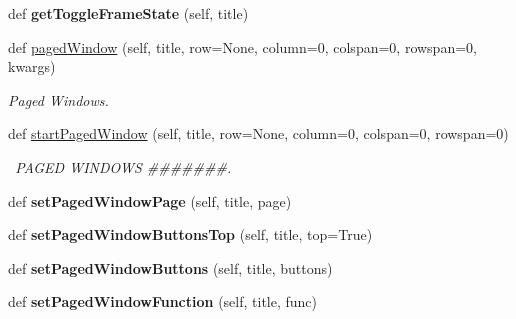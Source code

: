 \begin{DoxyCompactItemize}
\mbox{\label{class_python_01_g_u_i_1_1appjar_1_1gui_a4da3456b9cf56e925d637e1dff484bee}} 
def {\bfseries get\+Toggle\+Frame\+State} (self, title)
\item 
\mbox{\label{class_python_01_g_u_i_1_1appjar_1_1gui_a4ee391c09e882a456617d24693a8b80e}} 
def \hyperlink{class_python_01_g_u_i_1_1appjar_1_1gui_a4ee391c09e882a456617d24693a8b80e}{paged\+Window} (self, title, row=None, column=0, colspan=0, rowspan=0, kwargs)
\begin{DoxyCompactList}\small\item\em Paged Windows. \end{DoxyCompactList}\item 
\mbox{\label{class_python_01_g_u_i_1_1appjar_1_1gui_a7c084e8f9f4b0ba90f8c2ed1a6facfbd}} 
def \hyperlink{class_python_01_g_u_i_1_1appjar_1_1gui_a7c084e8f9f4b0ba90f8c2ed1a6facfbd}{start\+Paged\+Window} (self, title, row=None, column=0, colspan=0, rowspan=0)
\begin{DoxyCompactList}\small\item\em  \+P\+A\+G\+ED W\+I\+N\+D\+O\+WS \#\#\#\#\#\#\#. \end{DoxyCompactList}\item 
\mbox{\label{class_python_01_g_u_i_1_1appjar_1_1gui_a881fdbba323f9d8b069fbe9161c3f5ac}} 
def {\bfseries set\+Paged\+Window\+Page} (self, title, page)
\item 
\mbox{\label{class_python_01_g_u_i_1_1appjar_1_1gui_a2a1c0bfeb1812b915c378cf4900ecc35}} 
def {\bfseries set\+Paged\+Window\+Buttons\+Top} (self, title, top=True)
\item 
\mbox{\label{class_python_01_g_u_i_1_1appjar_1_1gui_abd7d8ed99eea08f361baa69641689d3f}} 
def {\bfseries set\+Paged\+Window\+Buttons} (self, title, buttons)
\item 
\mbox{\label{class_python_01_g_u_i_1_1appjar_1_1gui_a982e6af6dcb7897a682c0b0aa721678a}} 
def {\bfseries set\+Paged\+Window\+Function} (self, title, func)
\item 

\end{DoxyCompactItemize}
